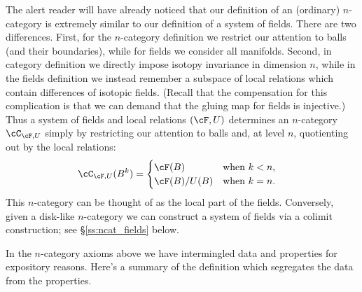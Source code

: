 The alert reader will have already noticed that our definition of an (ordinary) $n$-category
is extremely similar to our definition of a system of fields.
There are two differences.
First, for the $n$-category definition we restrict our attention to balls
(and their boundaries), while for fields we consider all manifolds.
Second,  in category definition we directly impose isotopy
invariance in dimension $n$, while in the fields definition we 
instead remember a subspace of local relations which contain differences of isotopic fields. 
(Recall that the compensation for this complication is that we can demand that the gluing map for fields is injective.)
Thus a system of fields and local relations $(\cF,U)$ determines an $n$-category $\cC_ {\cF,U}$ simply by restricting our attention to
balls and, at level $n$, quotienting out by the local relations:
\begin{align*}
\cC_{\cF,U}(B^k) & = \begin{cases}\cF(B) & \text{when $k<n$,} \\ \cF(B) / U(B) & \text{when $k=n$.}\end{cases}
\end{align*}
This $n$-category can be thought of as the local part of the fields.
Conversely, given a disk-like $n$-category we can construct a system of fields via 
a colimit construction; see \S \ref{ss:ncat_fields} below.

In the $n$-category axioms above we have intermingled data and properties for expository reasons.
Here's a summary of the definition which segregates the data from the properties.

